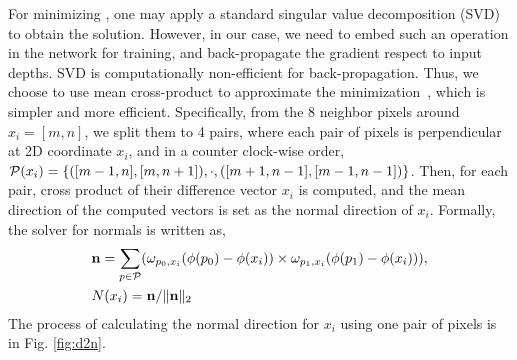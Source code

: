 For minimizing , one may apply a standard singular value decomposition (SVD) to obtain the solution. However, in our case, we need to embed such an operation in the network for training, and back-propagate the gradient respect to input depths. SVD is computationally non-efficient for back-propagation. Thus, we choose to use mean cross-product to approximate the minimization~\cite{jia2006using}, which is simpler and more efficient. 
Specifically, from the 8 neighbor pixels around $x_i = [m, n]$, we split them to 4 pairs, where each pair of pixels is perpendicular at 2D coordinate \wrt $x_i$, and in a counter clock-wise order, \ie ${\mathcal P}(x_i) = \{([m-1, n], [m, n+1]), \cdot, ([m+1, n-1], [m-1, n-1])\}$. 
Then, for each pair, cross product of their difference vector \wrt $x_i$ is computed, and the mean direction of the computed vectors is set as the normal direction of $x_i$. Formally, the solver for normals is written as, 
\begin{align}
\label{eq:cross}
&{\mathbf n} = \sum_{p\in{\mathcal P}}(\omega_{p_{0}, x_i}(\phi(p_{0}) - \phi(x_i)) \times \omega_{p_{1}, x_i}(\phi(p_{1}) - \phi(x_i))), \nonumber \\
&N(x_i) = {\mathbf n} / \|{\mathbf n}\|_2
\end{align}
The process of calculating the normal direction for $x_i$ using one pair of pixels is in Fig. \ref{fig:d2n}. 


